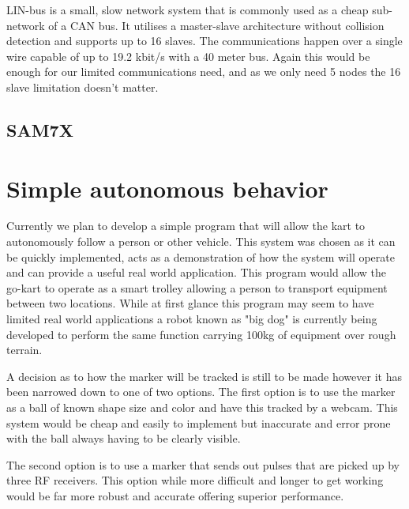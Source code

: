 LIN-bus is a small, slow network system that is commonly used as a cheap
sub-network of a CAN bus.  It utilises a master-slave architecture without
collision detection and supports up to 16 slaves.  The communications happen
over a single wire capable of up to 19.2 kbit/s with a 40 meter bus.  Again this
would be enough for our limited communications need, and as we only need 5 nodes
the 16 slave limitation doesn't matter.


\subsection{SAM7X}

\section{Simple autonomous behavior}

Currently we plan to develop a simple program that will allow the kart to autonomously follow a person or other vehicle. This system was chosen as it can be quickly implemented, acts as a demonstration of how the system will operate and can provide a useful real world application. This program would allow the go-kart to operate as a smart trolley allowing a person to transport equipment between two locations. While at first glance this program may seem to have limited real world applications a robot known as "big dog" is currently being developed to perform the same function carrying 100kg of equipment over rough terrain.

A decision as to how the marker will be tracked is still to be made however it has been narrowed down to one of two options. The first option is to use the marker as a ball of known shape size and color and have this tracked by a webcam. This system would be cheap and easily to implement but inaccurate and error prone with the ball always having to be clearly visible.

The second option is to use a marker that sends out pulses that are picked up by three RF receivers. This option while more difficult and longer to get working would be far more robust and accurate offering superior performance.


